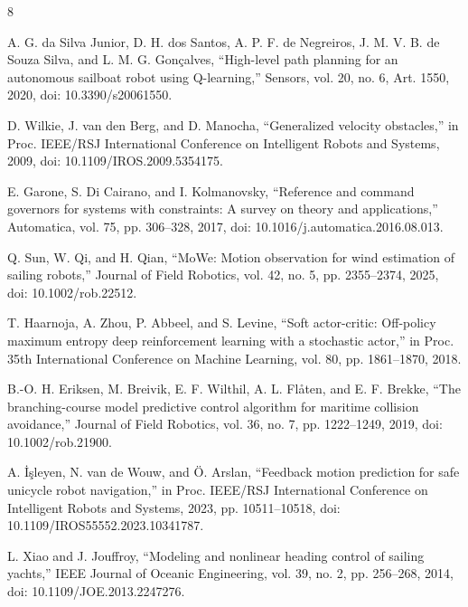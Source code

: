 \documentclass[conference]{IEEEtran}
\begin{document}
\begin{thebibliography}{8}

 A. G. da Silva Junior, D. H. dos Santos, A. P. F. de Negreiros, J. M. V. B. de Souza Silva, and L. M. G. Gon\c{c}alves, ``High-level path planning for an autonomous sailboat robot using Q-learning,'' Sensors, vol. 20, no. 6, Art. 1550, 2020, doi: 10.3390/s20061550.

 D. Wilkie, J. van den Berg, and D. Manocha, ``Generalized velocity obstacles,'' in Proc. IEEE/RSJ International Conference on Intelligent Robots and Systems, 2009, doi: 10.1109/IROS.2009.5354175.

 E. Garone, S. Di Cairano, and I. Kolmanovsky, ``Reference and command governors for systems with constraints: A survey on theory and applications,'' Automatica, vol. 75, pp. 306--328, 2017, doi: 10.1016/j.automatica.2016.08.013.

 Q. Sun, W. Qi, and H. Qian, ``MoWe: Motion observation for wind estimation of sailing robots,'' Journal of Field Robotics, vol. 42, no. 5, pp. 2355--2374, 2025, doi: 10.1002/rob.22512.

 T. Haarnoja, A. Zhou, P. Abbeel, and S. Levine, ``Soft actor-critic: Off-policy maximum entropy deep reinforcement learning with a stochastic actor,'' in Proc. 35th International Conference on Machine Learning, vol. 80, pp. 1861--1870, 2018.

 B.-O. H. Eriksen, M. Breivik, E. F. Wilthil, A. L. Fl\aa{}ten, and E. F. Brekke, ``The branching-course model predictive control algorithm for maritime collision avoidance,'' Journal of Field Robotics, vol. 36, no. 7, pp. 1222--1249, 2019, doi: 10.1002/rob.21900.

 A. \.{I}\c{s}leyen, N. van de Wouw, and \"{O}. Arslan, ``Feedback motion prediction for safe unicycle robot navigation,'' in Proc. IEEE/RSJ International Conference on Intelligent Robots and Systems, 2023, pp. 10511--10518, doi: 10.1109/IROS55552.2023.10341787.

 L. Xiao and J. Jouffroy, ``Modeling and nonlinear heading control of sailing yachts,'' IEEE Journal of Oceanic Engineering, vol. 39, no. 2, pp. 256--268, 2014, doi: 10.1109/JOE.2013.2247276.

\end{thebibliography}
\end{document}
